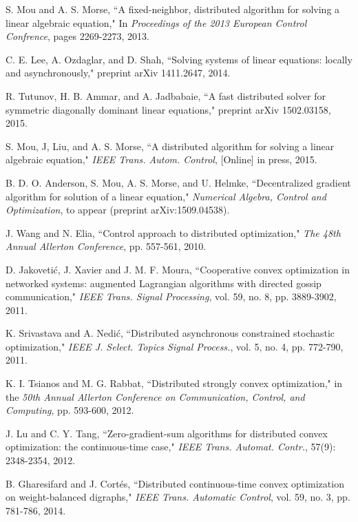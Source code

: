 \documentclass[a4paper, 11pt]{article}
\begin{document}
\begin{thebibliography}{99}
 S. Mou and A. S. Morse, ``A fixed-neighbor, distributed algorithm for
solving a linear algebraic equation,"  In {\em Proceedings of the 2013 European
Control Confrence}, pages 2269-2273, 2013.


 C. E. Lee, A. Ozdaglar, and D. Shah, ``Solving systems of linear equations: locally and asynchronously," preprint  arXiv 1411.2647, 2014.

R. Tutunov, H. B. Ammar, and A. Jadbabaie,  ``A fast distributed solver for symmetric diagonally dominant linear equations,"  preprint  arXiv 1502.03158, 2015.




 S.  Mou,  J, Liu, and  A. S.  Morse, ``A distributed algorithm for solving a linear algebraic equation," {\em IEEE Trans. Autom. Control},  [Online] in press, 2015.

 B. D. O. Anderson, S. Mou, A. S. Morse, and U. Helmke, ``Decentralized gradient algorithm for solution
of a linear equation," {\em Numerical Algebra, Control and Optimization}, to appear (preprint arXiv:1509.04538).



 J. Wang and N.  Elia,  ``Control approach to distributed optimization," {\em The 48th  Annual Allerton Conference}, pp. 557-561, 2010.


 D.  Jakoveti\'{c}, J. Xavier and J. M. F. Moura, ``Cooperative convex optimization in networked
systems: augmented Lagrangian algorithms
with directed gossip communication," {\em IEEE Trans. Signal Processing}, vol. 59, no. 8, pp. 3889-3902, 2011.

K. Srivastava and A. Nedi\'{c}, ``Distributed asynchronous constrained
stochastic optimization," {\em IEEE J. Select. Topics Signal Process.}, vol. 5,
no. 4, pp. 772-790, 2011.

 K. I. Tsianos and M. G. Rabbat, ``Distributed strongly convex optimization," in the {\em 50th Annual Allerton Conference on Communication, Control,
and Computing}, pp. 593-600, 2012.

 J. Lu and C. Y. Tang, ``Zero-gradient-sum algorithms for distributed convex optimization: the continuous-time case," {\em IEEE Trans. Automat. Contr.}, 57(9): 2348-2354, 2012.


 B. Gharesifard and  J. Cort\'{e}s, ``Distributed continuous-time convex optimization on weight-balanced digraphs," {\em IEEE Trans.  Automatic Control}, vol. 59, no. 3, pp. 781-786, 2014.


\end{thebibliography}
\end{document}
